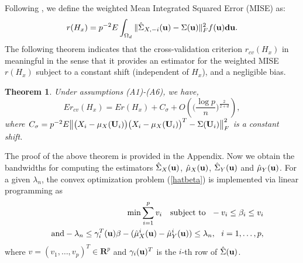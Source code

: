 \documentclass[11pt]{article}
\newtheorem{thm}{Theorem}%
\theoremstyle{definition}
\begin{document}
 Following \cite{Tsybakov}, we define the weighted  Mean Integrated Squared Error (MISE) as:
 \[
 r(H_x)=p^{-2}E\int_{\Omega_d}\|\hat{\Sigma}_{X,-i}({\bf u})-\Sigma({\bf u}) \|^2_F f(\bf u)d{\bf u}.
 \]
 The following theorem indicates
 that  the cross-validation  criterion  $r_{cv}(H_x)$ in meaningful in the sense that it provides an  estimator for the weighted  MISE $ r(H_x)$ subject to a constant shift (independent of $H_x$), and a negligible bias. 
 \begin{thm}\label{misethm}
 	Under assumptions (A1)-(A6), we have,
 	\[	Er_{cv}(H_x)= E  r(H_x)+C_\sigma+O\left(\Big(\frac{\log p}{n}\Big)^{\frac{2}{2+d}}\right),
 	\]
 	where $C_\sigma=p^{-2}	E\big\| \big(X_{i}-{\mu}_X({\bf U}_i)\big) \big(X_{i}-{\mu}_X({\bf U}_i)\big)^T- \Sigma({\bf U}_i)\big\|_F^2$ is a constant shift.
 \end{thm}
 The proof of the above theorem is provided in the Appendix.
 Now we obtain the bandwidths for computing the estimators $\hat{\Sigma}_X({\bf u})$, $\hat{\mu}_X({\bf u})$, $\hat{\Sigma}_Y({\bf u})$ and $\hat{\mu}_Y({\bf u})$. For a given $\lambda_n$, the convex
 optimization problem (\ref{hatbeta}) is implemented via linear programming as
 \begin{eqnarray*}
 	&&\min \sum_{i=1}^{p}v_i~~~ {\rm subject~ to}~~-v_i\leq \beta_i \leq
 	v_i\\
 	&&~{\rm and}-\lambda_n\leq \gamma_i^T({\bf u})\beta -(\hat{\mu}_X^i({\bf u})-\hat{\mu}_Y^i({\bf u}))\leq
 	\lambda_n,~~i=1,\ldots,p,
 \end{eqnarray*}
 where $v=(v_1,\ldots,v_p)^T\in \mathbf{R}^{p} $ and $\gamma_i({\bf u})^T$ is the
 $i$-th row of $\hat{\Sigma}({\bf u})$.
 
\end{document}
